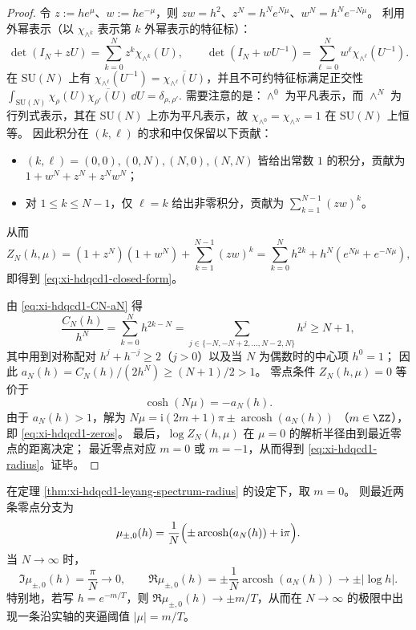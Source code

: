 \begin{proof}
令 \(z:=he^{\mu}\)、\(w:=he^{-\mu}\)，则 \(zw=h^{2}\)、\(z^{N}=h^{N}e^{N\mu}\)、\(w^{N}=h^{N}e^{-N\mu}\)。
利用外幂表示（以 \(\chi_{\wedge^{k}}\) 表示第 \(k\) 外幂表示的特征标）：
\[
\det(I_N+zU)=\sum_{k=0}^{N}z^{k}\chi_{\wedge^{k}}(U),
\qquad
\det(I_N+wU^{-1})=\sum_{\ell=0}^{N}w^{\ell}\chi_{\wedge^{\ell}}(U^{-1}).
\]
在 \(\mathrm{SU}(N)\) 上有 \(\chi_{\wedge^{\ell}}(U^{-1})=\overline{\chi_{\wedge^{\ell}}(U)}\)，并且不可约特征标满足正交性
\(
\int_{\mathrm{SU}(N)}\chi_{\rho}(U)\overline{\chi_{\rho'}(U)}\,\dd U=\delta_{\rho,\rho'}.
\)
需要注意的是：\(\wedge^{0}\) 为平凡表示，而 \(\wedge^{N}\) 为行列式表示，其在 \(\mathrm{SU}(N)\) 上亦为平凡表示，故
\(
\chi_{\wedge^{0}}=\chi_{\wedge^{N}}=1
\)
在 \(\mathrm{SU}(N)\) 上恒等。
因此积分在 \((k,\ell)\) 的求和中仅保留以下贡献：
\begin{itemize}
  \item \((k,\ell)=(0,0),(0,N),(N,0),(N,N)\) 皆给出常数 \(1\) 的积分，贡献为 \(1+w^{N}+z^{N}+z^{N}w^{N}\)；
  \item 对 \(1\le k\le N-1\)，仅 \(\ell=k\) 给出非零积分，贡献为 \(\sum_{k=1}^{N-1}(zw)^{k}\)。
\end{itemize}
从而
\[
Z_N(h,\mu)
=(1+z^{N})(1+w^{N})+\sum_{k=1}^{N-1}(zw)^{k}
=\sum_{k=0}^{N}h^{2k}+h^{N}(e^{N\mu}+e^{-N\mu}),
\]
即得到 \eqref{eq:xi-hdqcd1-closed-form}。
\par
由 \eqref{eq:xi-hdqcd1-CN-aN} 得
\[
\frac{C_N(h)}{h^{N}}=\sum_{k=0}^{N}h^{2k-N}
=
\sum_{j\in\{-N,-N+2,\dots,N-2,N\}}h^{j}
\ge N+1,
\]
其中用到对称配对 \(h^{j}+h^{-j}\ge 2\)（\(j>0\)）以及当 \(N\) 为偶数时的中心项 \(h^{0}=1\)；
因此 \(a_N(h)=C_N(h)/(2h^{N})\ge (N+1)/2>1\)。
零点条件 \(Z_N(h,\mu)=0\) 等价于
\[
\cosh(N\mu)=-a_N(h).
\]
由于 \(a_N(h)>1\)，解为
\(
N\mu=\mathrm{i}(2m+1)\pi\pm \operatorname{arcosh}(a_N(h))
\)
（\(m\in\ZZ\)），即 \eqref{eq:xi-hdqcd1-zeros}。
最后，\(\log Z_N(h,\mu)\) 在 \(\mu=0\) 的解析半径由到最近零点的距离决定；
最近零点对应 \(m=0\) 或 \(m=-1\)，从而得到 \eqref{eq:xi-hdqcd1-radius}。证毕。
\end{proof}

\begin{corollary}\label{cor:xi-hdqcd1-largeN-pinch}
在定理 \ref{thm:xi-hdqcd1-leyang-spectrum-radius} 的设定下，取 \(m=0\)。
则最近两条零点分支为
\[
\mu_{\pm,0}(h)=\frac{1}{N}\Bigl(\pm \operatorname{arcosh}(a_N(h))+\mathrm{i}\pi\Bigr).
\]
当 \(N\to\infty\) 时，
\[
\Im \mu_{\pm,0}(h)=\frac{\pi}{N}\longrightarrow 0,
\qquad
\Re \mu_{\pm,0}(h)=\pm \frac{1}{N}\operatorname{arcosh}(a_N(h))\longrightarrow \pm |\log h|.
\]
特别地，若写 \(h=e^{-m/T}\)，则 \(\Re \mu_{\pm,0}(h)\to \pm m/T\)，从而在 \(N\to\infty\) 的极限中出现一条沿实轴的夹逼阈值 \(|\mu|=m/T\)。
\end{corollary}

